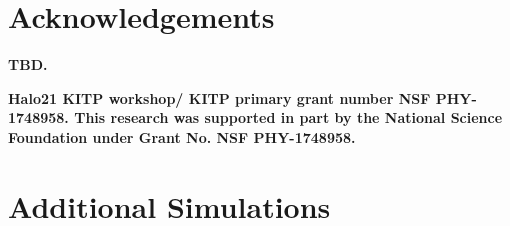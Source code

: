 \documentclass[fleqn,usenatbib]{mnras}
\begin{document}
\section*{Acknowledgements}

\textbf{TBD.}

\textbf{Halo21 KITP workshop/ KITP primary grant number NSF PHY-1748958.
This research was supported in part by the National Science Foundation under Grant No. NSF PHY-1748958.
}










\appendix

\section{Additional Simulations}
\end{document}
